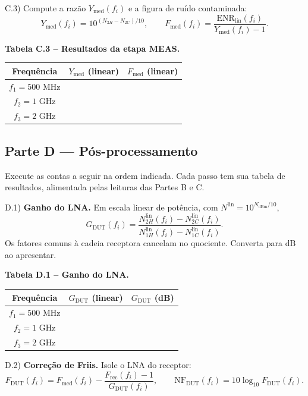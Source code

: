 \documentclass[11pt,a4paper]{article}
\begin{document}
C.3) Compute a razão $Y_{\text{med}}(f_i)$ e a figura de ruído contaminada:
\[
Y_{\text{med}}(f_i) = 10^{(N_{2H}-N_{2C})/10},
\qquad
F_{\text{med}}(f_i) = \frac{\mathrm{ENR}_{\text{lin}}(f_i)}{Y_{\text{med}}(f_i)-1}.
\]

\textbf{Tabela C.3 -- Resultados da etapa MEAS.}

{\renewcommand{\arraystretch}{1.5}
\begin{center}
\begin{tabular}{|c|c|c|}
\hline
\textbf{Frequência} & \textbf{$Y_{\text{med}}$ (linear)} & \textbf{$F_{\text{med}}$ (linear)} \\
\hline
$f_1 = 500$ MHz & & \\
\hline
$f_2 = 1$ GHz & & \\
\hline
$f_3 = 2$ GHz & & \\
\hline
\end{tabular}
\end{center}
}

\subsection*{Parte D --- Pós-processamento}

Execute as contas a seguir na ordem indicada. Cada passo tem sua tabela de resultados, alimentada pelas leituras das Partes B e C.

D.1) \textbf{Ganho do LNA.} Em escala linear de potência, com $N^{\text{lin}} = 10^{N_{\text{dBm}}/10}$,
\[
G_{\text{DUT}}(f_i) = \frac{N_{2H}^{\text{lin}}(f_i) - N_{2C}^{\text{lin}}(f_i)}{N_{1H}^{\text{lin}}(f_i) - N_{1C}^{\text{lin}}(f_i)}.
\]
Os fatores comuns à cadeia receptora cancelam no quociente. Converta para dB ao apresentar.

\textbf{Tabela D.1 -- Ganho do LNA.}

{\renewcommand{\arraystretch}{1.5}
\begin{center}
\begin{tabular}{|c|c|c|}
\hline
\textbf{Frequência} & \textbf{$G_{\text{DUT}}$ (linear)} & \textbf{$G_{\text{DUT}}$ (dB)} \\
\hline
$f_1 = 500$ MHz & & \\
\hline
$f_2 = 1$ GHz & & \\
\hline
$f_3 = 2$ GHz & & \\
\hline
\end{tabular}
\end{center}
}

D.2) \textbf{Correção de Friis.} Isole o LNA do receptor:
\[
F_{\text{DUT}}(f_i) = F_{\text{med}}(f_i) - \frac{F_{\text{rec}}(f_i) - 1}{G_{\text{DUT}}(f_i)},
\qquad
\mathrm{NF}_{\text{DUT}}(f_i) = 10\log_{10} F_{\text{DUT}}(f_i).
\]
\end{document}
